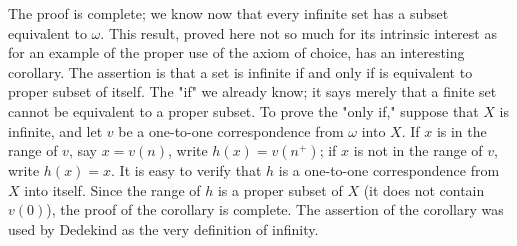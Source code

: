 The proof is complete; we know now that every infinite set has a subset equivalent to $\omega$. This result, proved here not so much for its intrinsic interest as for an example of the proper use of the axiom of choice, has an interesting corollary. The assertion is that a set is infinite if and only if is equivalent to proper subset of itself. The "if" we already know; it says merely that a finite set cannot be equivalent to a proper subset. To prove the "only if," suppose that $X$ is infinite, and let $v$ be a one-to-one correspondence from $\omega$ into $X$. If $x$ is in the range of $v$, say $x = v(n)$, write $h(x) = v(n^{+})$; if $x$ is not in the range of $v$, write $h(x)= x$. It is easy to verify that $h$ is a one-to-one correspondence from $X$ into itself. Since the range of $h$ is a proper subset of $X$ (it does not contain $v(0)$), the proof of the corollary is complete. The assertion of the corollary was used by Dedekind as the very definition of infinity.
